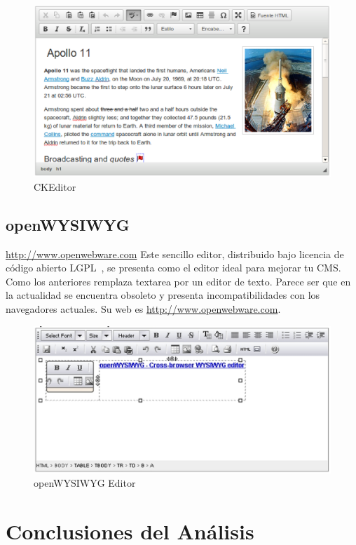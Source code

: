 \begin{figure}[h!]
  \centering
      \includegraphics[width=1.0\textwidth]{fig/cke1}
  \caption{CKEditor}
\end{figure}

\subsection{openWYSIWYG}
\url{http://www.openwebware.com}
Este sencillo editor, distribuido bajo licencia de código abierto LGPL~\cite{LGPL:lgpl}, se presenta como el editor ideal para mejorar tu CMS. Como los anteriores remplaza textarea por un editor de texto. Parece ser que en la actualidad se encuentra obsoleto y presenta incompatibilidades con los navegadores actuales. Su web es \url{http://www.openwebware.com}.


\begin{figure}[h!]
  \centering
      \includegraphics[width=1.0\textwidth]{fig/opene1}
  \caption{openWYSIWYG Editor}
\end{figure}


\section{Conclusiones del Análisis}

